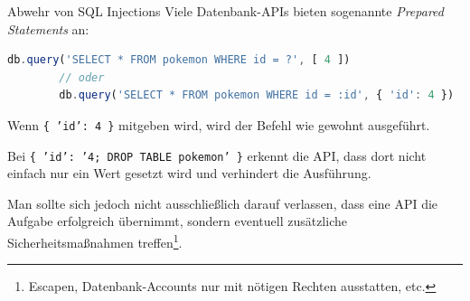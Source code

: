 \begin{bonus}{Abwehr von SQL Injections}
    Viele Datenbank-APIs bieten sogenannte \emph{Prepared Statements} an:

    \begin{lstlisting}[language=JavaScript]
        db.query('SELECT * FROM pokemon WHERE id = ?', [ 4 ])
        // oder
        db.query('SELECT * FROM pokemon WHERE id = :id', { 'id': 4 })
    \end{lstlisting}

    Wenn \texttt{\{ 'id': 4 \}} mitgeben wird, wird der Befehl wie gewohnt ausgeführt.

    Bei \texttt{\{ 'id': '4; DROP TABLE pokemon' \}} erkennt die API, dass dort nicht einfach nur ein Wert gesetzt wird und verhindert die Ausführung.

    Man sollte sich jedoch nicht ausschließlich darauf verlassen, dass eine API die Aufgabe erfolgreich übernimmt, sondern eventuell zusätzliche Sicherheitsmaßnahmen treffen\footnote{Escapen, Datenbank-Accounts nur mit nötigen Rechten ausstatten, etc.}.
\end{bonus}

